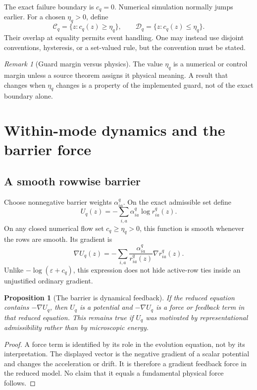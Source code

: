 \documentclass[11pt]{article}
\newtheorem{proposition}[theorem]{Proposition}
\theoremstyle{definition}
\theoremstyle{remark}
\newtheorem{remark}[theorem]{Remark}
\newcommand{\cC}{\mathcal C}
\newcommand{\cD}{\mathcal D}
\newcommand{\grad}{\nabla}
\begin{document}
The exact failure boundary is $c_q=0$.  Numerical simulation normally
jumps earlier.  For a chosen $\eta_q>0$, define
\[
 \cC_q=\{z:c_q(z)\ge\eta_q\},
 \qquad
 \cD_q=\{z:c_q(z)\le\eta_q\}.
\]
Their overlap at equality permits event handling.  One may instead use
disjoint conventions, hysteresis, or a set-valued rule, but the convention
must be stated.

\begin{remark}[Guard margin versus physics]
The value $\eta_q$ is a numerical or control margin unless a source theorem
assigns it physical meaning.  A result that changes when $\eta_q$ changes
is a property of the implemented guard, not of the exact boundary alone.
\end{remark}

\section{Within-mode dynamics and the barrier force}
\label{sec:flow}

\subsection{A smooth rowwise barrier}

Choose nonnegative barrier weights $\alpha_{ia}^{q}$.  On the exact
admissible set define
\[
 U_q(z)
 =
 -\sum_{i,a}\alpha_{ia}^{q}\log r_{ia}^{q}(z).
\]
On any closed numerical flow set $c_q\ge\eta_q>0$, this function is smooth
whenever the rows are smooth.  Its gradient is
\[
 \grad U_q(z)
 =
 -\sum_{i,a}
 \frac{\alpha_{ia}^{q}}{r_{ia}^{q}(z)}
 \grad r_{ia}^{q}(z).
\]
Unlike $-\log(\varepsilon+c_q)$, this expression does not hide active-row
ties inside an unjustified ordinary gradient.

\begin{proposition}[The barrier is dynamical feedback]
\label{prop:barrier-force}
If the reduced equation contains $-\grad U_q$, then $U_q$ is a potential
and $-\grad U_q$ is a force or feedback term in that reduced equation.
This remains true if $U_q$ was motivated by representational
admissibility rather than by microscopic energy.
\end{proposition}

\begin{proof}
A force term is identified by its role in the evolution equation, not by
its interpretation.  The displayed vector is the negative gradient of a
scalar potential and changes the acceleration or drift.  It is therefore
a gradient feedback force in the reduced model.  No claim that it equals a
fundamental physical force follows.
\end{proof}
\end{document}

